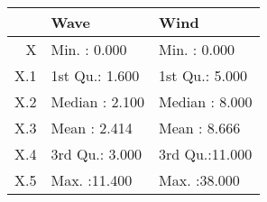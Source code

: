 \begin{tabular}{rll}
  \toprule
 &      Wave &      Wind \\ 
  \midrule
X & Min.   : 0.000   & Min.   : 0.000   \\ 
  X.1 & 1st Qu.: 1.600   & 1st Qu.: 5.000   \\ 
  X.2 & Median : 2.100   & Median : 8.000   \\ 
  X.3 & Mean   : 2.414   & Mean   : 8.666   \\ 
  X.4 & 3rd Qu.: 3.000   & 3rd Qu.:11.000   \\ 
  X.5 & Max.   :11.400   & Max.   :38.000   \\ 
   \bottomrule
\end{tabular}
